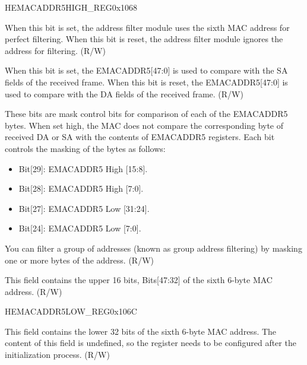 \begin{register}{H}{EMACADDR5HIGH\_REG}{0x1068}\label{regdesc:EMACADDR5HIGHREG}
%
%
%
%
%
\regnewline%
\begin{regdesc}\begin{reglist}
\item [ADDRESS\_ENABLE5]When this bit is set, the address filter module uses the sixth MAC address  for perfect filtering. When this bit is reset, the address filter module ignores the address for filtering. (R/W)
\item [SOURCE\_ADDRESS5]When this bit is set, the EMACADDR5[47:0] is used to compare with the SA fields of the received frame. When this bit is reset, the EMACADDR5[47:0] is used to compare with the DA fields of the received frame. (R/W)
\item [MASK\_BYTE\_CONTROL5]These bits are mask control bits for comparison of each of the EMACADDR5 bytes. When set high, the MAC does not compare the corresponding byte of received DA or SA with the contents of EMACADDR5 registers. Each bit controls the masking of the bytes as follows: \begin{itemize}
\item Bit[29]: EMACADDR5 High [15:8]. \item Bit[28]: EMACADDR5 High [7:0]. \item Bit[27]: EMACADDR5 Low [31:24]. \item Bit[24]: EMACADDR5 Low [7:0].
\end{itemize} You can filter a group of addresses (known as group address filtering) by masking one or more bytes of the address. (R/W)
\item [MAC\_ADDRESS5\_HI]This field contains the upper 16 bits, Bits[47:32] of the sixth 6-byte MAC address. (R/W)
\end{reglist}\end{regdesc}
\end{register}

\begin{register}{H}{EMACADDR5LOW\_REG}{0x106C}\label{regdesc:EMACADDR5LOWREG}
%
\regnewline%
\begin{regdesc}\begin{reglist}
\item [EMACADDR5LOW\_REG]This field contains the lower 32 bits of the sixth 6-byte MAC address. The content of this field is undefined, so the register needs to be configured after the initialization process. (R/W)
\end{reglist}\end{regdesc}
\end{register}

